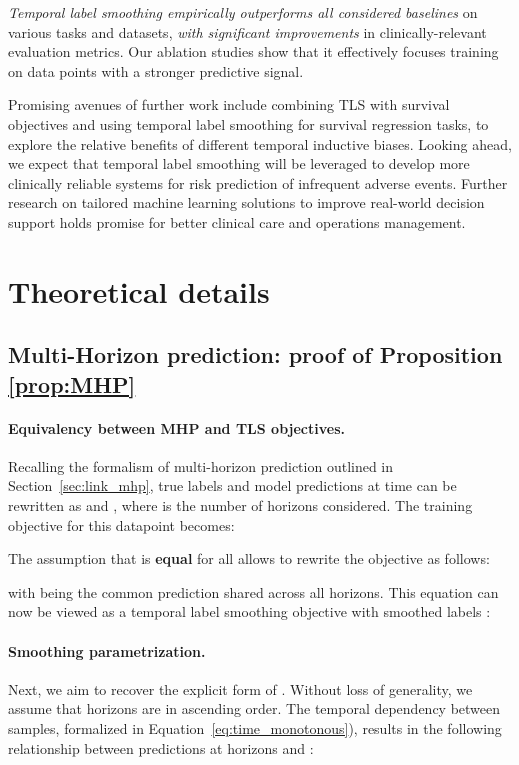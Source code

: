 \documentclass[nohyperref]{article}
\begin{document}
{\it Temporal label smoothing empirically outperforms all considered baselines} on various tasks and datasets, {\it with significant improvements} in clinically-relevant evaluation metrics. Our ablation studies show that it effectively focuses training on data points with a stronger predictive signal.





Promising avenues of further work include combining TLS with survival objectives and using temporal label smoothing for survival regression tasks, to explore the relative benefits of different temporal inductive biases. Looking ahead, we expect that temporal label smoothing will be leveraged to develop more clinically reliable systems for risk prediction of infrequent adverse events. Further research on tailored machine learning solutions to improve real-world decision support holds promise for better clinical care and operations management.


\newpage



\appendix
\newpage
\onecolumn



\section{Theoretical details} 

\subsection{Multi-Horizon prediction: proof of Proposition \ref{prop:MHP}}
\label{appendix:MHP_link}
\paragraph{Equivalency between MHP and TLS objectives.}
Recalling the formalism of multi-horizon prediction outlined in Section~\ref{sec:link_mhp}, true labels and model predictions at time  can be rewritten as  and , where  is the number of horizons considered. The training objective for this datapoint becomes:
    

The assumption that   is \textbf{equal} for all  allows to rewrite the objective as follows:
    
with  being the common prediction shared across all horizons. This equation can now be viewed as a temporal label smoothing objective with smoothed labels :
    
    
\paragraph{Smoothing parametrization.}
Next, we aim to recover the explicit form of . Without loss of generality, we assume that horizons  are in ascending order. The temporal dependency between samples, formalized in Equation~\ref{eq:time_monotonous}), results in the following relationship between predictions at horizons  and  :
\end{document}
